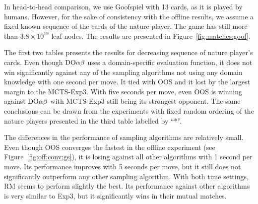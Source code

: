 In head-to-head comparison, we use Goofspiel with 13 cards, as it is played by humans. However, for the sake of consistency with the offline results, we assume a fixed known sequence of the cards of the nature player. The game has still more than $3.8\times 10^{19}$ leaf nodes. The results are presented in Figure~\ref{fig:matches:goof}.

The first two tables presents the results for decreasing sequence of nature player's cards. Even though $\textrm{DO}\alpha\beta$ uses a domain-specific evaluation function, it does not win significantly against any of the sampling algorithms not using any domain knowledge with one second per move. It tied with OOS and it lost by the largest margin to the MCTS-Exp3. With five seconds per move, even OOS is winning against $\textrm{DO}\alpha\beta$ with MCTS-Exp3 still being its strongest opponent. The same conclusions can be drawn from the experiments with fixed random ordering of the nature players presented in the third table labelled by ``*''.


The differences in the performance of sampling algorithms are relatively small. Even though OOS converges the fastest in the offline experiment (see Figure~\ref{fig:off:conv:gs}), it is losing against all other algorithms with 1 second per move. Its performance improves with 5 seconds per move, but it still does not significantly outperform any other sampling algorithm. With both time settings, RM seems to perform slightly the best. Its performance against other algorithms is very similar to Exp3, but it significantly wins in their mutual matches.


